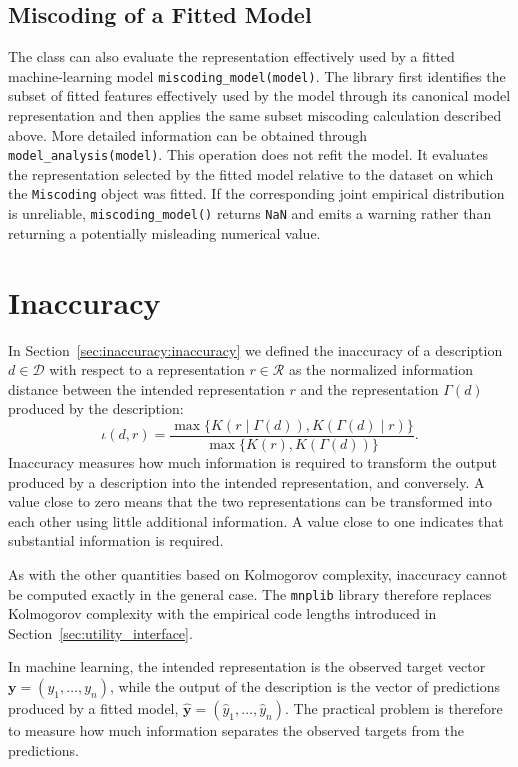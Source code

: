 \subsection*{Miscoding of a Fitted Model}

The class can also evaluate the representation effectively used by a fitted machine-learning model \texttt{miscoding\_model(model)}. The library first identifies the subset of fitted features effectively used by
the model through its canonical model representation and then applies the same subset miscoding calculation described above. More detailed information can be obtained through \texttt{model\_analysis(model)}. This operation does not refit the model. It evaluates the representation selected by the fitted model relative to the dataset on which the \texttt{Miscoding} object was fitted. If the corresponding joint empirical distribution is unreliable, \texttt{miscoding\_model()} returns \texttt{NaN} and emits a warning rather
than returning a potentially misleading numerical value.

%
%

\section{Inaccuracy}
\label{sec:machine_learning_inaccuracy}

In Section~\ref{sec:inaccuracy:inaccuracy} we defined the inaccuracy of a description $d\in\mathcal{D}$ with respect to a representation $r\in\mathcal{R}$ as the normalized information distance between the intended representation $r$ and the representation $\Gamma(d)$ produced by the description:
\[
\iota(d,r) = \frac{\max\{K(r\mid\Gamma(d)), K(\Gamma(d)\mid r)\}}{\max\{K(r), K(\Gamma(d))\}}.
\]
Inaccuracy measures how much information is required to transform the output produced by a description into the intended representation, and conversely. A value close to zero means that the two representations can be transformed into each other using little additional information. A value close to one indicates that substantial information is required.

As with the other quantities based on Kolmogorov complexity, inaccuracy cannot be computed exactly in the general case. The \texttt{mnplib} library therefore replaces Kolmogorov complexity with the empirical code lengths introduced in Section~\ref{sec:utility_interface}.

In machine learning, the intended representation is the observed target vector $\mathbf{y} = (y_1,\ldots,y_n)$, while the output of the description is the vector of predictions produced by a fitted model, $\hat{\mathbf{y}} = (\hat y_1,\ldots,\hat y_n)$. The practical problem is therefore to measure how much information separates the observed targets from the predictions.


